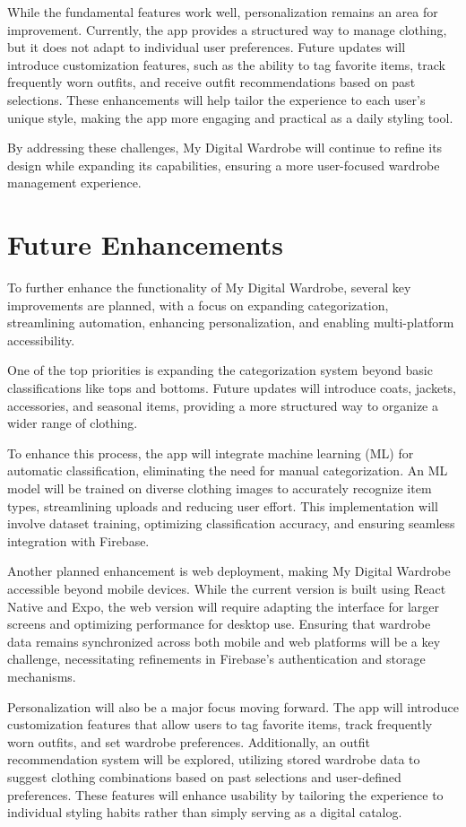While the fundamental features work well, personalization remains an area for improvement. Currently, the app provides a structured way to manage clothing, but it does not adapt to individual user preferences. Future updates will introduce customization features, such as the ability to tag favorite items, track frequently worn outfits, and receive outfit recommendations based on past selections. These enhancements will help tailor the experience to each user’s unique style, making the app more engaging and practical as a daily styling tool.

By addressing these challenges, My Digital Wardrobe will continue to refine its design while expanding its capabilities, ensuring a more user-focused wardrobe management experience.

\section{Future Enhancements}
To further enhance the functionality of My Digital Wardrobe, several key improvements are planned, with a focus on expanding categorization, streamlining automation, enhancing personalization, and enabling multi-platform accessibility.

One of the top priorities is expanding the categorization system beyond basic classifications like tops and bottoms. Future updates will introduce coats, jackets, accessories, and seasonal items, providing a more structured way to organize a wider range of clothing.

To enhance this process, the app will integrate machine learning (ML) for automatic classification, eliminating the need for manual categorization. An ML model will be trained on diverse clothing images to accurately recognize item types, streamlining uploads and reducing user effort. This implementation will involve dataset training, optimizing classification accuracy, and ensuring seamless integration with Firebase.

Another planned enhancement is web deployment, making My Digital Wardrobe accessible beyond mobile devices. While the current version is built using React Native and Expo, the web version will require adapting the interface for larger screens and optimizing performance for desktop use. Ensuring that wardrobe data remains synchronized across both mobile and web platforms will be a key challenge, necessitating refinements in Firebase’s authentication and storage mechanisms.

Personalization will also be a major focus moving forward. The app will introduce customization features that allow users to tag favorite items, track frequently worn outfits, and set wardrobe preferences. Additionally, an outfit recommendation system will be explored, utilizing stored wardrobe data to suggest clothing combinations based on past selections and user-defined preferences. These features will enhance usability by tailoring the experience to individual styling habits rather than simply serving as a digital catalog.

